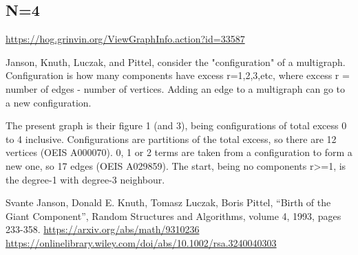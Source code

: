 \documentclass{article}
\begin{document}
\subsection{N=4}
\url{https://hog.grinvin.org/ViewGraphInfo.action?id=33587}

Janson, Knuth, Luczak, and Pittel, consider the "configuration" of a
multigraph.  Configuration is how many components have excess
r=1,2,3,etc, where excess r = number of edges - number of vertices.
Adding an edge to a multigraph can go to a new configuration.

The present graph is their figure 1 (and 3), being configurations of
total excess 0 to 4 inclusive.  Configurations are partitions of the
total excess, so there are 12 vertices (OEIS A000070).  0, 1 or 2
terms are taken from a configuration to form a new one, so 17 edges
(OEIS A029859).  The start, being no components r>=1, is the degree-1
with degree-3 neighbour.

Svante Janson, Donald E. Knuth, Tomasz Luczak, Boris Pittel, ``Birth
of the Giant Component'', Random Structures and Algorithms, volume 4,
1993, pages 233-358.
\newline
\url{https://arxiv.org/abs/math/9310236}
\newline
\url{https://onlinelibrary.wiley.com/doi/abs/10.1002/rsa.3240040303}

\begin{center}
\end{center}
\end{document}
